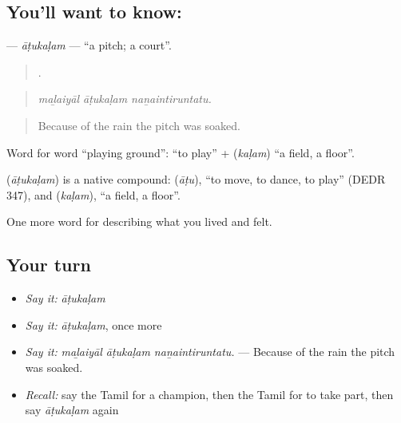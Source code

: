 \subsection*{You'll want to know: }
\textbf{} — \emph{āṭukaḷam} — \textquotedblleft{}a pitch; a court\textquotedblright{}.

\begin{quote}
  .
\end{quote}

\begin{quote}
\emph{maḻaiyāl āṭukaḷam naṉaintiruntatu.}
\end{quote}

\begin{quote}
Because of the rain the pitch was soaked.
\end{quote}

Word for word \textquotedblleft{}playing ground\textquotedblright{}:  \textquotedblleft{}to play\textquotedblright{} +  (\emph{kaḷam}) \textquotedblleft{}a field, a floor\textquotedblright{}.

\begin{cousinweb}
\textbf{} (\emph{āṭukaḷam}) is a native compound:  (\emph{āṭu}), \textquotedblleft{}to move, to dance, to play\textquotedblright{} (DEDR 347), and  (\emph{kaḷam}), \textquotedblleft{}a field, a floor\textquotedblright{}.
\end{cousinweb}

\begin{grammarlens}[title={What you've built}]
One more word for describing what you lived and felt.
\end{grammarlens}

\subsection*{Your turn}
\begin{itemize}
\raggedright
  \item \emph{Say it:} \emph{āṭukaḷam}
  \item \emph{Say it:} \emph{āṭukaḷam}, once more
  \item \emph{Say it:} \emph{maḻaiyāl āṭukaḷam naṉaintiruntatu.} — Because of the rain the pitch was soaked.
  \item \emph{Recall:} say the Tamil for a champion, then the Tamil for to take part, then say \emph{āṭukaḷam} again
\end{itemize}

